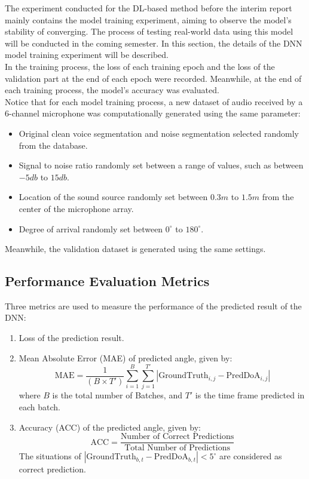 The experiment conducted for the DL-based method before the interim report mainly contains the model training experiment, aiming to observe the model's stability of converging. The process of testing real-world data using this model will be conducted in the coming semester. In this section, the details of the DNN model training experiment will be described.\\
In the training process, the loss of each training epoch and the loss of the validation part at the end of each epoch were recorded. Meanwhile, at the end of each training process, the model's accuracy was evaluated.\\
Notice that for each model training process, a new dataset of audio received by a 6-channel microphone was computationally generated using the same parameter:
\begin{itemize}
    \item Original clean voice segmentation and noise segmentation selected randomly from the database.
    \item Signal to noise ratio randomly set between a range of values, such as between \(-5 db\) to \(15 db\).
    \item Location of the sound source randomly set between \(0.3m\) to \(1.5m\) from the center of the microphone array.
    \item Degree of arrival randomly set between \(0^{\circ}\) to \(180^\circ\).
\end{itemize}
Meanwhile, the validation dataset is generated using the same settings.\\

\subsection*{Performance Evaluation Metrics}
Three metrics are used to measure the performance of the predicted result of the DNN:
\begin{enumerate}
    \item Loss of the prediction result.
    \item Mean Absolute Error (MAE) of predicted angle, given by:
    \[
        \text{MAE} = \frac{1}{(B\times T')} \sum_{i = 1}^{B}\sum_{j = 1}^{T'} |\text{GroundTruth}_{i,j}-\text{PredDoA}_{i,j}|
    \]
    where \(B\) is the total number of Batches, and \(T'\) is the time frame predicted in each batch.
    \item Accuracy (ACC) of the predicted angle, given by:
    \[
        \text{ACC} = \frac{\text{Number of Correct Predictions}}{\text{Total Number of Predictions}}
    \]
    The situations of \(|\text{GroundTruth}_{b,t}-\text{PredDoA}_{b,t}| < 5^\circ\) are considered as correct prediction.
\end{enumerate}


